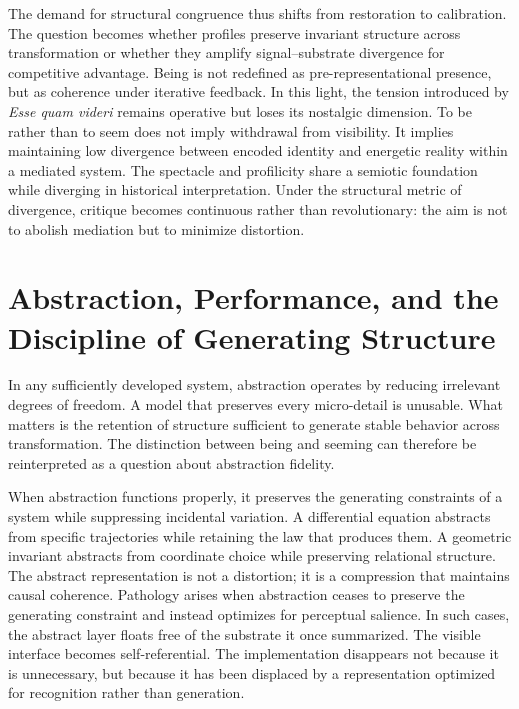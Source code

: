 \documentclass[11pt]{article}
\begin{document}
The demand for structural congruence thus shifts from restoration to calibration. The question becomes whether profiles preserve invariant structure across transformation or whether they amplify signal--substrate divergence for competitive advantage. Being is not redefined as pre-representational presence, but as coherence under iterative feedback. In this light, the tension introduced by \textit{Esse quam videri} remains operative but loses its nostalgic dimension. To be rather than to seem does not imply withdrawal from visibility. It implies maintaining low divergence between encoded identity and energetic reality within a mediated system. The spectacle and profilicity share a semiotic foundation while diverging in historical interpretation. Under the structural metric of divergence, critique becomes continuous rather than revolutionary: the aim is not to abolish mediation but to minimize distortion.

\section{Abstraction, Performance, and the Discipline of Generating Structure}

In any sufficiently developed system, abstraction operates by reducing irrelevant degrees of freedom. A model that preserves every micro-detail is unusable. What matters is the retention of structure sufficient to generate stable behavior across transformation. The distinction between being and seeming can therefore be reinterpreted as a question about abstraction fidelity.

When abstraction functions properly, it preserves the generating constraints of a system while suppressing incidental variation. A differential equation abstracts from specific trajectories while retaining the law that produces them. A geometric invariant abstracts from coordinate choice while preserving relational structure. The abstract representation is not a distortion; it is a compression that maintains causal coherence. Pathology arises when abstraction ceases to preserve the generating constraint and instead optimizes for perceptual salience. In such cases, the abstract layer floats free of the substrate it once summarized. The visible interface becomes self-referential. The implementation disappears not because it is unnecessary, but because it has been displaced by a representation optimized for recognition rather than generation.
\end{document}
